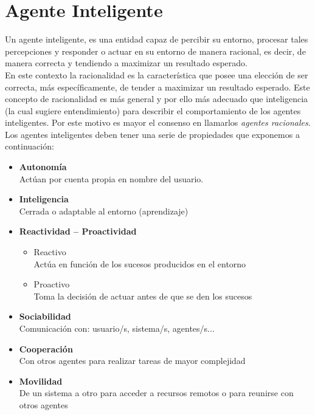 \documentclass[a4paper,12pt,oneside]{book}
\begin{document}
\section{Agente Inteligente}
Un agente inteligente, es una entidad capaz de percibir su entorno,
procesar tales percepciones y responder o actuar en su entorno de
manera racional, es decir, de manera correcta y tendiendo a maximizar
un resultado esperado.\\

En este contexto la racionalidad es la característica que posee una
elección de ser correcta, más específicamente, de tender a maximizar
un resultado esperado. Este concepto de racionalidad es más general y
por ello más adecuado que inteligencia (la cual sugiere entendimiento)
para describir el comportamiento de los agentes inteligentes. Por este
motivo es mayor el consenso en llamarlos {\it agentes racionales}.\\

Los agentes inteligentes deben tener una serie de propiedades que
exponemos a continuación:
\begin {itemize}
\item {\bf Autonomía}\\
  Actúan por cuenta propia en nombre del usuario.
\item {\bf Inteligencia}\\
  Cerrada o adaptable al entorno (aprendizaje)
\item {\bf Reactividad – Proactividad}
  \begin {itemize}
  \item Reactivo\\
    Actúa en función de los sucesos producidos en el entorno
  \item Proactivo\\
    Toma la decisión de actuar antes de que se den los sucesos
  \end{itemize}
\item {\bf Sociabilidad}\\
  Comunicación con: usuario/s, sistema/s, agentes/s...

\item {\bf Cooperación}\\
  Con otros agentes para realizar tareas de  mayor complejidad
\item {\bf Movilidad}\\
  De un sistema a otro para acceder a
  recursos remotos o para reunirse con otros
  agentes
\end {itemize}
\end{document}
